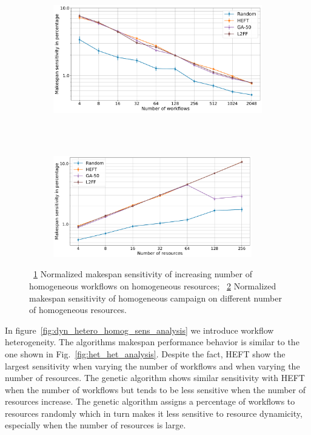 \begin{figure}[ht!]
    \centering
    \begin{subfigure}[b]{0.75\textwidth}
        \includegraphics[width=.95\textwidth]{figures/campaign/StHomoCampaigns_4DynHomoResourcesSens.pdf}
        \caption{}
        \label{fig:StHomoCampaigns_4DyHomoResourcesSens}
    \end{subfigure}\\
    ~ 
    \begin{subfigure}[b]{0.75\textwidth}
        \includegraphics[width=0.95\textwidth]{figures/campaign/DynHomoResources_StHomoCampaignsSens.pdf}
        \caption{}
        \label{fig:DyHomoResources_StHomoCampaignsSens}
    \end{subfigure}
    \caption{~\ref{fig:StHomoCampaigns_4DyHomoResourcesSens} Normalized makespan sensitivity of increasing number of homogeneous workflows on homogeneous resources;
        ~\ref{fig:DyHomoResources_StHomoCampaignsSens} Normalized makespan sensitivity  of homogeneous campaign on different number of homogeneous resources.}
    \label{fig:dyn_homog_sens_analysis}
\end{figure}

In figure~\ref{fig:dyn_hetero_homog_sens_analysis} we introduce workflow heterogeneity.
The algorithms makespan performance behavior is similar to the one shown in Fig.~\ref{fig:het_het_analysis}.
Despite the fact, HEFT show the largest sensitivity when varying the number of workflows and when varying the number of resources.
The genetic algorithm shows similar sensitivity with HEFT when the number of workflows but tends to be less sensitive when the number of resources increase.
The genetic algorithm assigns a percentage of workflows to resources randomly which in turn makes it less sensitive to resource dynamicity, especially when the number of resources is large.


